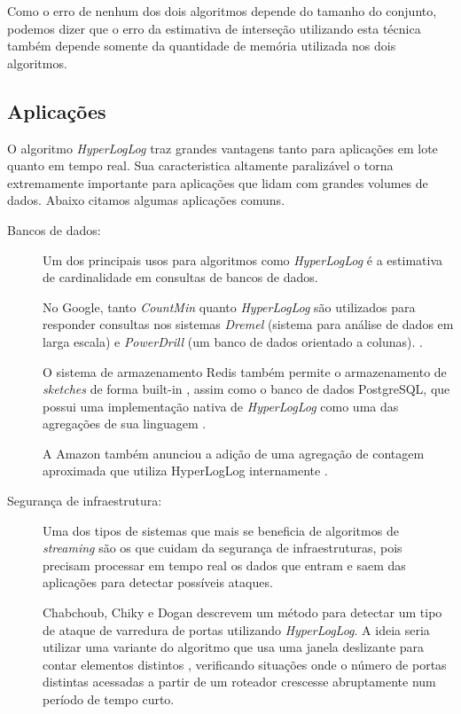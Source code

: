 Como o erro de nenhum dos dois algoritmos depende do tamanho do conjunto, podemos dizer que o erro da estimativa de interseção utilizando esta técnica também depende somente da quantidade de memória utilizada nos dois algoritmos.

\subsection{Aplicações}

O algoritmo \emph{HyperLogLog} traz grandes vantagens tanto para aplicações em lote quanto em tempo real. Sua caracteristica altamente paralizável o torna extremamente importante para aplicações que lidam com grandes volumes de dados. Abaixo citamos algumas aplicações comuns.

\begin{description}

\item[Bancos de dados:]

Um dos principais usos para algoritmos como \emph{HyperLogLog} é a estimativa de cardinalidade em consultas de bancos de dados.

No Google, tanto \emph{CountMin} quanto \emph{HyperLogLog} são utilizados para responder consultas nos sistemas \emph{Dremel} (sistema para análise de dados em larga escala) e \emph{PowerDrill} (um banco de dados orientado a colunas). \cite{hall2012processing,melnik2010dremel,heule2013hyperloglog}.

O sistema de armazenamento Redis também permite o armazenamento de \emph{sketches} de forma built-in \cite{sindhu2015brief}, assim como o banco de dados PostgreSQL, que possui uma implementação nativa de \emph{HyperLogLog} como uma das agregações de sua linguagem \cite{chabchoub2014can}.

A Amazon também anunciou a adição de uma agregação de contagem aproximada que utiliza HyperLogLog internamente \cite{amazon2015hyperloglog}.

\item[Segurança de infraestrutura:]

Uma dos tipos de sistemas que mais se beneficia de algoritmos de \emph{streaming} são os que cuidam da segurança de infraestruturas, pois precisam processar em tempo real os dados que entram e saem das aplicações para detectar possíveis ataques.

Chabchoub, Chiky e Dogan \cite{chabchoub2014can} descrevem um método para detectar um tipo de ataque de varredura de portas utilizando \emph{HyperLogLog}. A ideia seria utilizar uma variante do algoritmo que usa uma janela deslizante para contar elementos distintos \cite{chabchoub2010sliding}, verificando situações onde o número de portas distintas acessadas a partir de um roteador crescesse abruptamente num período de tempo curto.


\end{description}
